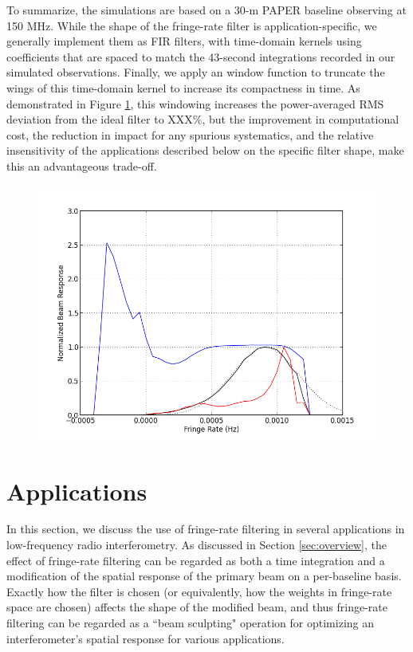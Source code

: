 \documentclass[twocolumn,apj,numberedappendix]{emulateapj}
\begin{document}
To summarize, the simulations are based on a 30-m PAPER baseline observing at 150 MHz.  While the shape of the fringe-rate
filter is application-specific, we generally implement them as FIR filters, with time-domain kernels using coefficients that
are spaced to match the 43-second integrations recorded in our simulated observations.  Finally, we apply an window function to
truncate the wings of this time-domain kernel to increase its compactness in time.  As demonstrated in Figure \ref{fig:fringe_weights},
this windowing increases the power-averaged RMS deviation from the ideal filter to XXX\%, but the improvement in computational cost,
the reduction in impact for any spurious systematics, and the relative insensitivity of the applications described below on the specific
filter shape, make this an advantageous trade-off.

\begin{figure}\centering
\includegraphics[width=.9\columnwidth]{plots/fringe_wgts.png}
\caption{
}\label{fig:fringe_weights}
\end{figure}


\section{Applications}
\label{sec:bmsculpt}

In this section, we discuss the use of fringe-rate filtering in several applications in low-frequency radio interferometry. As discussed in Section \ref{sec:overview}, the effect of fringe-rate filtering can be regarded as both a time integration and a modification of the spatial response of the primary beam on a per-baseline basis. Exactly how the filter is chosen (or equivalently, how the weights in fringe-rate space are chosen) affects the shape of the modified beam, and thus fringe-rate filtering can be regarded as a ``beam sculpting" operation for optimizing an interferometer's spatial response for various applications.
\end{document}

